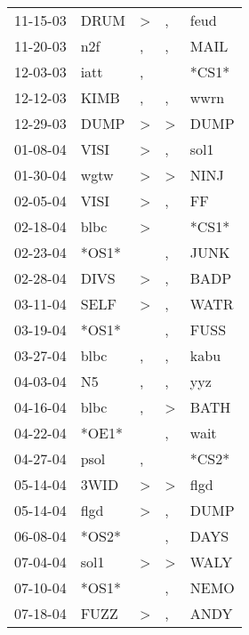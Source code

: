 \begin{supertabular}{lllll}
 11-15-03 &   DRUM &     \textgreater &                , &   feud \\
 11-20-03 &    n2f &                , &                , &   MAIL \\
 12-03-03 &   iatt &                , &                  &  *CS1* \\
 12-12-03 &   KIMB &                , &                , &   wwrn \\
 12-29-03 &   DUMP &     \textgreater &     \textgreater &   DUMP \\
 01-08-04 &   VISI &     \textgreater &                , &   sol1 \\
 01-30-04 &   wgtw &     \textgreater &     \textgreater &   NINJ \\
 02-05-04 &   VISI &     \textgreater &                , &     FF \\
 02-18-04 &   blbc &     \textgreater &                  &  *CS1* \\
 02-23-04 &  *OS1* &                  &                , &   JUNK \\
 02-28-04 &   DIVS &     \textgreater &                , &   BADP \\
 03-11-04 &   SELF &     \textgreater &                , &   WATR \\
 03-19-04 &  *OS1* &                  &                , &   FUSS \\
 03-27-04 &   blbc &                , &                , &   kabu \\
 04-03-04 &     N5 &                , &                , &    yyz \\
 04-16-04 &   blbc &                , &     \textgreater &   BATH \\
 04-22-04 &  *OE1* &                  &                , &   wait \\
 04-27-04 &   psol &                , &                  &  *CS2* \\
 05-14-04 &   3WID &     \textgreater &     \textgreater &   flgd \\
 05-14-04 &   flgd &     \textgreater &                , &   DUMP \\
 06-08-04 &  *OS2* &                  &                , &   DAYS \\
 07-04-04 &   sol1 &     \textgreater &     \textgreater &   WALY \\
 07-10-04 &  *OS1* &                  &                , &   NEMO \\
 07-18-04 &   FUZZ &     \textgreater &                , &   ANDY \\

\end{supertabular}
